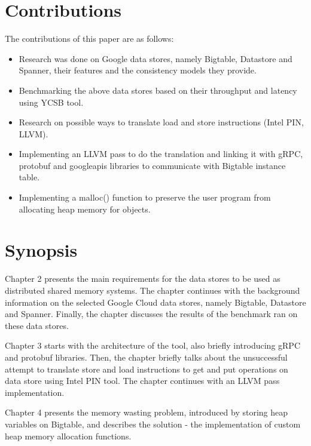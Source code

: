 \documentclass[bsc,frontabs,twoside,singlespacing,parskip,deptreport]{infthesis}     %
\begin{document}
\section{Contributions}

The contributions of this paper are as follows:
\begin{itemize}
\item
Research was done on Google data stores, namely Bigtable, Datastore and Spanner, their features and the consistency models they provide.
\item
Benchmarking the above data stores based on their throughput and latency using YCSB tool.
\item
Research on possible ways to translate load and store instructions (Intel PIN, LLVM).
\item
Implementing an LLVM pass to do the translation and linking it with gRPC, protobuf and googleapis libraries to communicate with Bigtable instance table.
\item
Implementing a malloc() function to preserve the user program from allocating heap memory for objects.
\end{itemize}


\section{Synopsis}

Chapter 2 presents the main requirements for the data stores to be used as distributed shared memory systems. The chapter continues with the background information on the selected Google Cloud data stores, namely Bigtable, Datastore and Spanner. Finally, the chapter discusses the results of the benchmark ran on these data stores.

Chapter 3 starts with the architecture of the tool, also briefly introducing gRPC and protobuf libraries. Then, the chapter briefly talks about the unsuccessful attempt to translate store and load instructions to get and put operations on data store using Intel PIN tool. The chapter continues with an LLVM pass implementation.

Chapter 4 presents the memory wasting problem, introduced by storing heap variables on Bigtable, and describes the solution - the implementation of custom heap memory allocation functions. 
\end{document}

